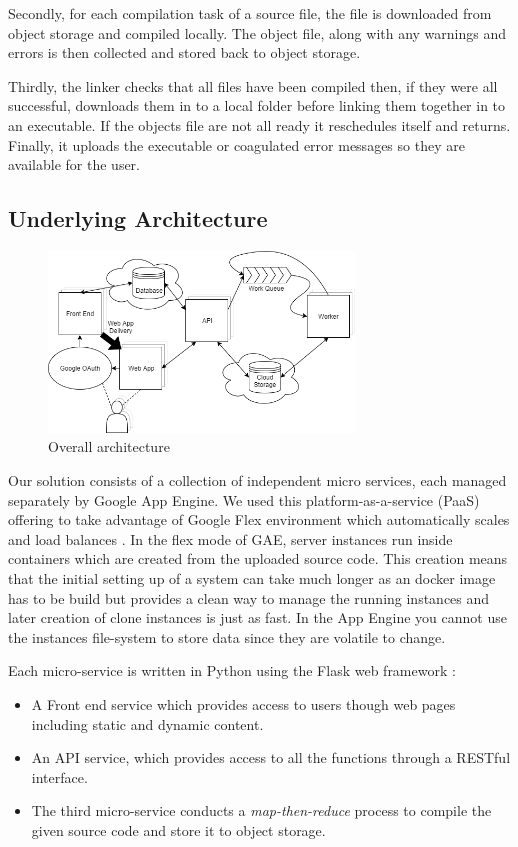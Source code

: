 \documentclass[conference]{IEEEtran}
\begin{document}
Secondly, for each compilation task of a source file, the file is downloaded
from object storage and compiled locally. The object file, along with any
warnings and errors is then collected and stored back to object storage.

Thirdly, the linker checks that all files have been compiled then, if they were
all successful, downloads them in to a local folder before linking them together
in to an executable. If the objects file are not all ready it reschedules
itself and returns. Finally, it uploads the executable or coagulated error
messages so they are available for the user.

\subsection{Underlying Architecture}
\begin{figure}[ht] %
    \centering
    \includegraphics[width=3.2in]{OverallArchitecture.png}
    \caption{Overall architecture}
    \label{fig:underlying}
\end{figure}

Our solution consists of a collection of independent micro services, each
managed separately by Google App Engine. We used this platform-as-a-service
(PaaS) offering to take advantage of Google Flex environment which
automatically scales and load balances \cite{GAE}. In the flex mode of GAE,
server instances run inside containers which are created from the uploaded
source code. This creation means that the initial setting up of a system can
take much longer as an docker image has to be build but provides a clean way to
manage the running instances and later creation of clone instances is just as
fast. In the App Engine you cannot use the instances file-system to store data
since they are volatile to change.

Each micro-service is written in Python using the Flask web framework \cite{Flask}:

\begin{itemize}
\item A Front end service which provides access to users though web
pages including static and dynamic content.

\item An API service, which provides
access to all the functions through a RESTful interface.

\item The third micro-service conducts a \emph{map-then-reduce} process to
compile the given source code and store it to object storage.
\end{itemize}
\end{document}
